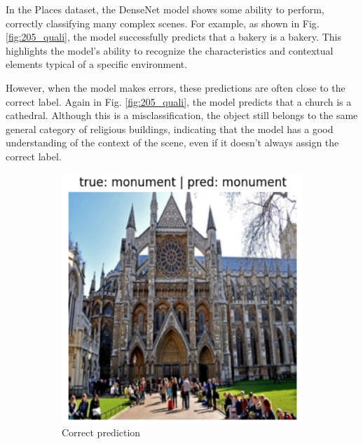 \documentclass[twocolumn,superscriptaddress,aps]{revtex4-1}
\begin{document}
In the Places dataset, the DenseNet model shows some ability to perform, correctly classifying many complex scenes. For example, as shown in Fig. \ref{fig:205_quali}, the model successfully predicts that a bakery is a bakery. This highlights the model's ability to recognize the characteristics and contextual elements typical of a specific environment.

However, when the model makes errors, these predictions are often close to the correct label. Again in Fig. \ref{fig:205_quali}, the model predicts that a church is a cathedral. Although this is a misclassification, the object still belongs to the same general category of religious buildings, indicating that the model has a good understanding of the context of the scene, even if it doesn't always assign the correct label.

\begin{figure}[H]
    \centering
    \begin{subfigure}{0.235 \textwidth}
        \includegraphics[width=\textwidth]{images/17_good_monument.png}
        \caption{Correct prediction}
    \end{subfigure}
    \begin{subfigure}{0.235 \textwidth}

\end{subfigure}
\end{figure}
\end{document}
